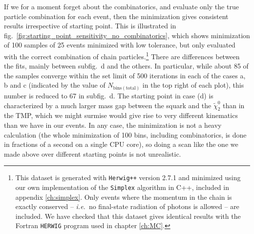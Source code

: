 \documentclass[twoside,english]{uiofysmaster}
\begin{document}
If we for a moment forget about the combinatorics, and evaluate only the true particle combination for each event, then the minimization gives consistent results irrespective of starting point. This is illustrated in fig.\ \ref{fig:starting_point_sensitivity_no_combinatorics}, which shows minimization of 100 samples of 25 events minimized with low tolerance, but only evaluated with the correct combination of chain particles.\footnote{This dataset is generated with {\tt Herwig++} version 2.7.1 \cite{Bahr:2008pv} and minimized using our own implementation of the {\tt Simplex} algorithm in C++, included in appendix \ref{ch:simplex}. Only events where the momentum in the chain is exactly conserved -- {\it i.e.}\ no final-state radiation of photons is allowed -- are included. We have checked that this dataset gives identical results with the Fortran {\tt HERWIG} program used in chapter \ref{ch:MC}.} There are differences between the fits, mainly between subfig.\ d and the others. In particular, while about 85 of the samples converge within the set limit of 500 iterations in each of the cases a, b and c (indicated by the value of $N_\mathrm{bins(total)}$ in the top right of each plot), this number is reduced to 67 in subfig.\ d. The starting point in case (d) is characterized by a much larger mass gap between the squark and the $\tilde\chi_2^0$ than in the TMP, which we might surmise would give rise to very different kinematics than we have in our events. In any case, the minimization is not a heavy calculation (the whole minimization of 100 bins, including combinatorics, is done in fractions of a second on a single CPU core), so doing a scan like the one we made above over different starting points is not unrealistic.
\end{document}
